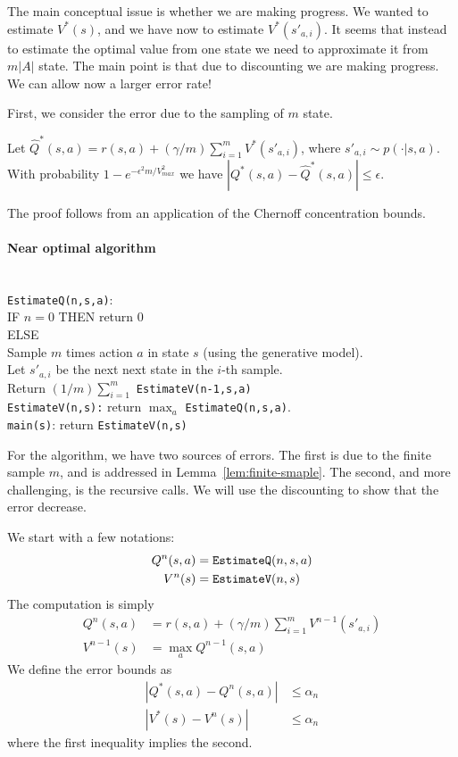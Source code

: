 The main conceptual issue is whether we are making progress. We
wanted to estimate $V^*(s)$, and we have now to estimate
$V^*(s'_{a,i})$. It seems that instead to estimate the optimal value
from one state we need to approximate it from $m|A|$ state. The main
point is that due to discounting we are making progress. We can
allow now a larger error rate!

First, we consider the error due to the sampling of $m$ state.
\begin{lemma}
\label{lem:finite-smaple} Let $\hat{Q}^*(s,a)=r(s,a)+(\gamma
/m)\sum_{i=1}^m V^*(s'_{a,i})$, where $s'_{a,i}\sim p(\cdot|s,a)$.
With probability $1-e^{-\epsilon^2 m/V^2_{max}}$ we have
$|Q^*(s,a)-\hat{Q}^*(s,a)|\leq \epsilon$.
\end{lemma}
The proof follows from an application of the Chernoff concentration
bounds.

\paragraph{Near optimal algorithm}\ \\

\bigskip
\noindent
{\tt EstimateQ(n,s,a)}:\\
IF $n=0$ THEN return $0$\\
ELSE\\
Sample $m$ times action $a$ in state $s$ (using the generative
model).\\
Let $s'_{a,i}$ be the next next state in the $i$-th sample.\\
Return $(1/m)\sum_{i=1}^m$ {\tt EstimateV(n-1,s,a)}\\

\medskip
\noindent
{\tt EstimateV(n,s):} return $\max_a$ {\tt EstimateQ(n,s,a)}.\\

\medskip
\noindent
{\tt main(s)}: return {\tt EstimateV(n,s)}\\
\bigskip

For the algorithm, we have two sources of errors. The first is due
to the finite sample $m$, and is addressed in
Lemma~\ref{lem:finite-smaple}. The second, and more challenging, is
the recursive calls. We will use the discounting to show that the
error decrease.

We start with a few notations:
\begin{align*}
Q^n(s,a)&={\tt EstimateQ}(n,s,a)\\
V^n(s)&={\tt EstimateV}(n,s)
\end{align*}
The computation is simply
\begin{align*}
Q^n(s,a)&=r(s,a)+(\gamma/m)\sum_{i=1}^m V^{n-1}(s'_{a,i})\\
V^{n-1}(s)&=\max_a Q^{n-1}(s,a)
\end{align*}
We define the error bounds as
\begin{align*}
|Q^*(s,a)-Q^n(s,a)|&\leq \alpha_n\\
|V^*(s)-V^n(s)|&\leq \alpha_n
\end{align*}
where the first inequality implies the second.

